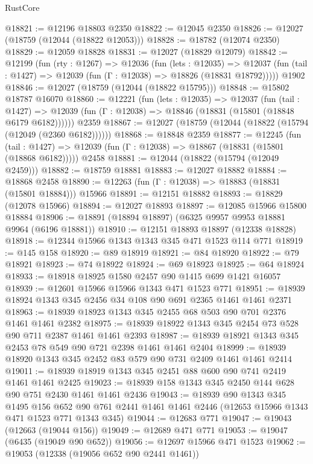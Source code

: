 \begin{lexlean}{RustCore}
\begin{coremodule}
@18821 := @12196 @18803 @2350
@18822 := @12045 @2350
@18826 := @12027 (@18759 (@12044 (@18822 @12053)))
@18828 := @18782 (@12074 @2350)
@18829 := @12059 @18828
@18831 := @12027 (@18829 @12079)
@18842 := @12199
    (fun (rty : @1267) =>
    @12036
      (fun (lets : @12035) =>
      @12037 (fun (tail : @1427) => @12039 (fun (Γ : @12038) => @18826 (@18831 @18792)))))
    @1902
@18846 := @12027 (@18759 (@12044 (@18822 @15795)))
@18848 := @15802 @18787 @16070
@18860 := @12221
    (fun (lets : @12035) =>
    @12037
      (fun (tail : @1427) =>
      @12039 (fun (Γ : @12038) => @18846 (@18831 (@15801 (@18848 @6179 @6182))))))
    @2359
@18867 := @12027 (@18759 (@12044 (@18822 (@15794 (@12049 (@2360 @6182))))))
@18868 := @18848 @2359
@18877 := @12245
    (fun (tail : @1427) => @12039 (fun (Γ : @12038) => @18867 (@18831 (@15801 (@18868 @6182)))))
    @2458
@18881 := @12044 (@18822 (@15794 (@12049 @2459)))
@18882 := @18759 @18881
@18883 := @12027 @18882
@18884 := @18868 @2458
@18890 := @12263 (fun (Γ : @12038) => @18883 (@18831 (@15801 @18884))) @15966
@18891 := @12151 @18882
@18893 := @18829 (@12078 @15966)
@18894 := @12027 @18893
@18897 := @12085 @15966 @15800 @18884
@18906 := @18891 (@18894 @18897) (@6325 @9957 @9953 @18881 @9964 (@6196 @18881))
@18910 := @12151 @18893 @18897 (@12338 @18828)
@18918 := @12344 @15966 @1343 @1343 @345 @471 @1523 @114 @771
@18919 := @145 @158
@18920 := @89 @18919
@18921 := @84 @18920
@18922 := @79 @18921
@18923 := @74 @18922
@18924 := @69 @18923
@18925 := @64 @18924
@18933 := @18918 @18925 @1580 @2457 @90 @1415 @699 @1421 @16057
@18939 := @12601 @15966 @15966 @1343 @471 @1523 @771
@18951 := @18939 @18924 @1343 @345 @2456 @34 @108 @90 @691 @2365 @1461 @1461 @2371
@18963 := @18939 @18923 @1343 @345 @2455 @68 @503 @90 @701 @2376 @1461 @1461 @2382
@18975 := @18939 @18922 @1343 @345 @2454 @73 @528 @90 @711 @2387 @1461 @1461 @2393
@18987 := @18939 @18921 @1343 @345 @2453 @78 @549 @90 @721 @2398 @1461 @1461 @2404
@18999 := @18939 @18920 @1343 @345 @2452 @83 @579 @90 @731 @2409 @1461 @1461 @2414
@19011 := @18939 @18919 @1343 @345 @2451 @88 @600 @90 @741 @2419 @1461 @1461 @2425
@19023 := @18939 @158 @1343 @345 @2450 @144 @628 @90 @751 @2430 @1461 @1461 @2436
@19043 := @18939
    @90
    @1343
    @345
    @1495
    @156
    @652
    @90
    @761
    @2441
    @1461
    @1461
    @2446
    (@12653 @15966 @1343 @471 @1523 @771 @1343 @345)
@19044 := @12683 @771
@19047 := @19043 (@12663 (@19044 @156))
@19049 := @12689 @471 @771
@19053 := @19047 (@6435 (@19049 @90 @652))
@19056 := @12697 @15966 @471 @1523
@19062 := @19053 (@12338 (@19056 @652 @90 @2441 @1461))

\end{coremodule}
\end{lexlean}
